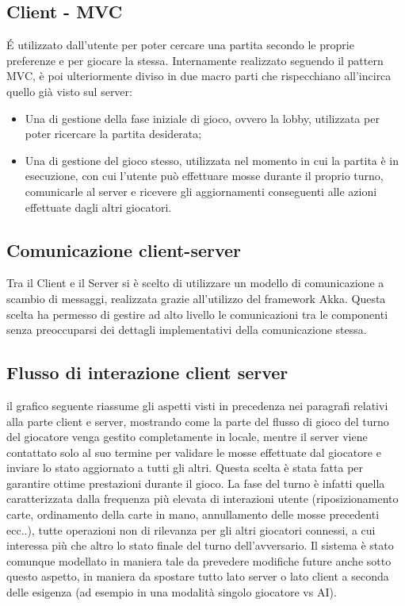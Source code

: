   \subsection{Client - MVC}
  É utilizzato dall’utente per poter cercare una partita secondo le proprie preferenze e per giocare la stessa.
  Internamente realizzato seguendo il pattern MVC, è poi ulteriormente diviso in due macro parti che rispecchiano all’incirca quello già visto sul server:
\begin{itemize}
  \item Una di gestione della fase iniziale di gioco, ovvero la lobby, utilizzata per poter ricercare la partita desiderata;
  \item Una di gestione del gioco stesso, utilizzata nel momento in cui la partita è in esecuzione, con cui l’utente può effettuare mosse durante il proprio turno, comunicarle al server e ricevere gli aggiornamenti conseguenti alle azioni effettuate dagli altri giocatori.
\end{itemize}

  \subsection{Comunicazione client-server}
  Tra il Client e il Server si è scelto di utilizzare un modello di comunicazione a scambio di messaggi, realizzata grazie all’utilizzo del framework Akka.
  Questa scelta ha permesso di gestire ad alto livello le comunicazioni tra le componenti senza preoccuparsi dei dettagli implementativi della comunicazione stessa.

  \subsection[Flussi di interazione]{Flusso di interazione client server}
  il grafico seguente riassume gli aspetti visti in precedenza nei paragrafi relativi alla parte client e server, mostrando come la parte del flusso di gioco del turno del giocatore venga gestito completamente in locale, mentre il server viene contattato solo al suo termine per validare le mosse effettuate dal giocatore e inviare lo stato aggiornato a tutti gli altri.
  Questa scelta è stata fatta per garantire ottime prestazioni durante il gioco. La fase del turno è infatti quella caratterizzata dalla frequenza più elevata di interazioni utente (riposizionamento carte, ordinamento della carte in mano, annullamento delle mosse precedenti ecc..), tutte operazioni non di rilevanza per gli altri giocatori connessi, a cui interessa più che altro lo stato finale del turno dell’avversario.
  Il sistema è stato comunque modellato in maniera tale da prevedere modifiche future anche sotto questo aspetto, in maniera da spostare tutto lato server o lato client a seconda delle esigenza (ad esempio in una modalità singolo giocatore vs AI).

  \newpage